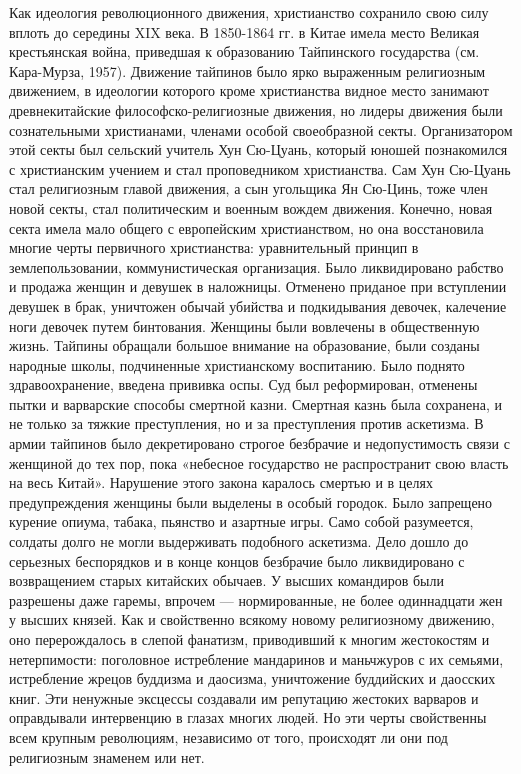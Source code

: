 Как идеология революционного движения, христианство сохранило свою
силу вплоть до середины XIX века. В 1850-1864 гг. в Китае имела место
Великая крестьянская война, приведшая к образованию Тайпинского
государства (см. Кара-Мурза, 1957). Движение тайпинов было ярко
выраженным религиозным движением, в идеологии которого кроме
христианства видное место занимают древнекитайские
философско-религиозные движения, но лидеры движения были сознательными
христианами, членами особой своеобразной секты. Организатором этой
секты был сельский учитель Хун Сю-Цуань, который юношей познакомился с
христианским учением и стал проповедником христианства. Сам Хун
Сю-Цуань стал религиозным главой движения, а сын угольщика Ян Сю-Цинь,
тоже член новой секты, стал политическим и военным вождем движения.
Конечно, новая секта имела мало общего с европейским христианством, но
она восстановила многие черты первичного христианства: уравнительный
принцип в землепользовании, коммунистическая организация. Было
ликвидировано рабство и продажа женщин и девушек в наложницы. Отменено
приданое при вступлении девушек в брак, уничтожен обычай убийства и
подкидывания девочек, калечение ноги девочек путем бинтования. Женщины
были вовлечены в общественную жизнь. Тайпины обращали большое внимание
на образование, были созданы народные школы, подчиненные христианскому
воспитанию. Было поднято здравоохранение, введена прививка оспы. Суд
был реформирован, отменены пытки и варварские способы смертной казни.
Смертная казнь была сохранена, и не только за тяжкие преступления, но
и за преступления против аскетизма. В армии тайпинов было
декретировано строгое безбрачие и недопустимость связи с женщиной до
тех пор, пока «небесное государство не распространит свою власть на
весь Китай». Нарушение этого закона каралось смертью и в целях
предупреждения женщины были выделены в особый городок. Было запрещено
курение опиума, табака, пьянство и азартные игры. Само собой
разумеется, солдаты долго не могли выдерживать подобного аскетизма.
Дело дошло до серьезных беспорядков и в конце концов безбрачие было
ликвидировано с возвращением старых китайских обычаев. У высших
командиров были разрешены даже гаремы, впрочем --- нормированные, не
более одиннадцати жен у высших князей. Как и свойственно всякому
новому религиозному движению, оно перерождалось в слепой фанатизм,
приводивший к многим жестокостям и нетерпимости: поголовное
истребление мандаринов и маньчжуров с их семьями, истребление жрецов
буддизма и даосизма, уничтожение буддийских и даосских книг. Эти
ненужные эксцессы создавали им репутацию жестоких варваров и
оправдывали интервенцию в глазах многих людей. Но эти черты
свойственны всем крупным революциям, независимо от того, происходят ли
они под религиозным знаменем или нет.

